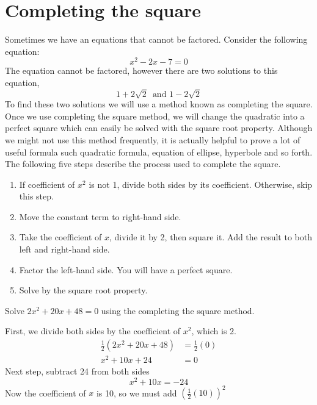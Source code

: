 \section{Completing the square}
Sometimes we have an equations that cannot be factored. Consider the following 
equation: \[x^2 − 2x − 7 = 0\]
The equation cannot be factored, however there are 
two solutions to this equation,\[
    1 + 2 \sqrt{2}\,\,\,\text{and}\,\, 1 − 2\sqrt{2}
\]
To find these two solutions we will use a method known as completing the square.\\
Once we use completing the square method, we will change the quadratic into a perfect square which can easily be solved with the square root property. Although we might not use this method frequently, it is actually helpful to prove a lot of useful formula such quadratic formula, equation of ellipse, hyperbole and so forth. \\
The following five steps describe the process used to complete the square. 
%
\begin{tcolorbox}[title=Completing the square,
                    fonttitle=\bfseries,
                    colframe=blue!70!red,
                    colback=white]
 \begin{enumerate}
	\item If coefficient of $x^2$ is not 1, divide both sides by its coefficient.
			Otherwise, skip this step.
	\item Move the constant term to right-hand side.
	\item Take the coefficient of $x$, divide it by 2, then square it. Add the
			result to both left and right-hand side.
	\item Factor the left-hand side. You will have a perfect square.
	\item Solve by the square root property.	
 \end{enumerate}	
\end{tcolorbox}
\begin{exa}
	Solve $2x^2+20x+48=0$ using the completing the square method.
\end{exa}
First, we divide both sides by the coefficient of $x^2$, which is 2. 
		\begin{align*}
				\frac{1}{2}\left(2x^2+20x+48\right)&=\frac{1}{2}\left(0\right)\\
				x^2+10x+24 &=0
		\end{align*}
Next step, subtract 24 from both sides
		\[
				x^2+10x = -24
		\]
Now the coefficient of $x$ is 10, so we must add $\left(\frac{1}{2}(10)\right)^2$
